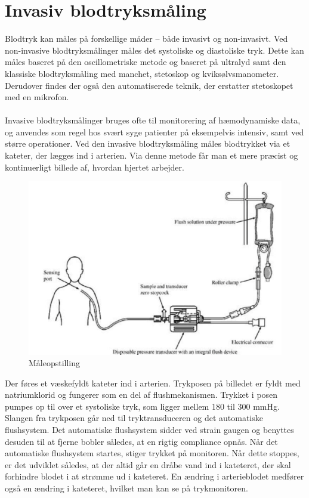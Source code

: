 \section{Invasiv blodtryksmåling}
Blodtryk kan måles på forskellige måder – både invasivt og non-invasivt. Ved non-invasive blodtryksmålinger måles det systoliske og diastoliske tryk. Dette kan måles baseret på den oscillometriske metode og baseret på ultralyd samt den klassiske blodtryksmåling med manchet, stetoskop og kviksølvsmanometer. Derudover findes der også den automatiserede teknik, der erstatter stetoskopet med en mikrofon. \\\\
Invasive blodtryksmålinger bruges ofte til monitorering af hæmodynamiske data, og anvendes som regel hos svært syge patienter på eksempelvis intensiv, samt ved større operationer. Ved den invasive blodtryksmåling måles blodtrykket via et kateter, der lægges ind i arterien. Via denne metode får man et mere præcist og kontinuerligt billede af, hvordan hjertet arbejder. 
\begin{figure}[H]
	\centering
	\includegraphics[width=1\textwidth]{Figurer/Snip20151207_50}
	\caption{Måleopstilling}
\end{figure}
Der føres et væskefyldt kateter ind i arterien. Trykposen på billedet er fyldt med natriumklorid og fungerer som en del af flushmekanismen. Trykket i posen pumpes op til over et systoliske tryk, som ligger mellem 180 til 300 mmHg. Slangen fra trykposen går ned til tryktransduceren og det automatiske flushsystem. Det automatiske flushsystem sidder ved strain gaugen og benyttes desuden til at fjerne bobler således, at en rigtig compliance opnås.  Når det automatiske flushsystem startes, stiger trykket på monitoren. Når dette stoppes, er det udviklet således, at der altid går en dråbe vand ind i kateteret, der skal forhindre blodet i at strømme ud i kateteret. En ændring i arterieblodet medfører også en ændring i kateteret, hvilket man kan se på trykmonitoren. \\\\
